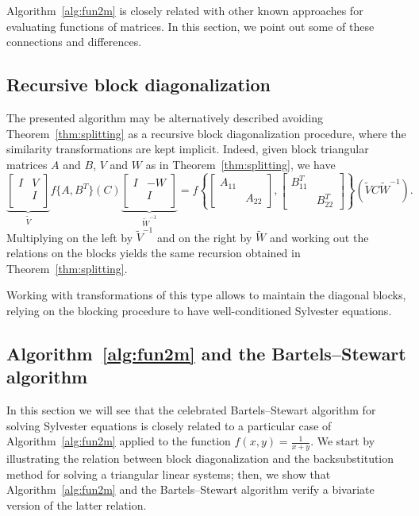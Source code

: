 \documentclass{siamart1116}
\renewcommand{\tilde}{\widetilde}
\begin{document}
Algorithm~\ref{alg:fun2m} is closely related with other known approaches 
for evaluating functions of matrices. In this section, we point out some
of these connections and differences.

\subsection{Recursive block diagonalization}
\label{sec:block-diagonalization}

The presented algorithm may be alternatively described 
avoiding Theorem~\ref{thm:splitting} as 
a recursive block diagonalization procedure, where the similarity
transformations are kept implicit. Indeed, given block triangular 
matrices $A$ and $B$, $V$ and $W$ as in Theorem~\ref{thm:splitting}, 
we have 
\[
  \underbrace{\begin{bmatrix}
    I & V \\
    & I \\
  \end{bmatrix}}_{\tilde V}
  f\{ A, B^T \}(C) 
  \underbrace{\begin{bmatrix}
    I & -W \\
    & I \\
  \end{bmatrix}}_{\tilde W^{-1}} = 
  f\left\{ 
    \begin{bmatrix}
      A_{11} \\
      & A_{22}
    \end{bmatrix}, \begin{bmatrix}
      B_{11}^T \\
      & B_{22}^T
    \end{bmatrix}
  \right\}(\tilde V C \tilde W^{-1}).
\]
Multiplying on the left by $\tilde V^{-1}$ and on the right by
$\tilde W$ and working out the relations on the blocks 
yields the same recursion obtained in 
Theorem~\ref{thm:splitting}. 

Working with transformations of this type allows to maintain the
diagonal blocks, relying on the blocking procedure to 
have well-conditioned Sylvester equations. 

\subsection{Algorithm~\ref{alg:fun2m} and the Bartels--Stewart algorithm} \label{ref:bs-connection}
In this section we will see that the celebrated Bartels--Stewart algorithm \cite{bartels1972algorithm} for 
solving Sylvester equations is closely related  to a particular case of Algorithm~\ref{alg:fun2m} applied to the function $f(x, y)=\frac{1}{x+y}$. We start by illustrating the relation between
block diagonalization and the backsubstitution method for
solving a triangular linear systems; then, we show that Algorithm~\ref{alg:fun2m} and the Bartels--Stewart algorithm verify 
a bivariate version of the latter relation.
\end{document}
